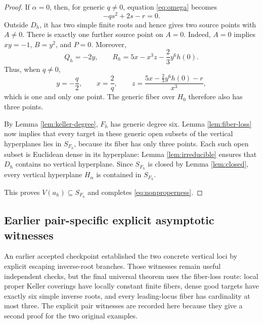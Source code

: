 \documentclass[11pt]{article}
\begin{document}
\begin{proof}
If $\alpha=0$, then, for generic $q\ne0$, equation \eqref{eq:omega} becomes
\[
 -qs^2+2s-r=0.
\]
Outside $D_h$, it has two simple finite roots and hence gives two source
points with $A\ne0$.  There is exactly one further source point on $A=0$.
Indeed, $A=0$ implies $xy=-1$, $B=y^2$, and $P=0$.  Moreover,
\[
 Q_h=-2y,
 \qquad
 R_h=5x-x^3z-\frac23y^6h(0).
\]
Thus, when $q\ne0$,
\[
 y=-\frac q2,
 \qquad
 x=\frac2q,
 \qquad
 z=\frac{5x-\frac23y^6h(0)-r}{x^3},
\]
which is one and only one point.  The generic fiber over $H_0$ therefore also
has three points.

By Lemma \ref{lem:keller-degree}, $F_h$ has generic degree six.  Lemma
\ref{lem:fiber-loss} now implies that every target in these generic open
subsets of the vertical hyperplanes lies in $S_{F_h}$, because its fiber has
only three points.  Each such open subset is Euclidean dense in its
hyperplane: Lemma \ref{lem:irreducible} ensures that $D_h$ contains no
vertical hyperplane.  Since $S_{F_h}$ is closed by Lemma \ref{lem:closed},
every vertical hyperplane $H_\alpha$ is contained in $S_{F_h}$.

This proves $V(a_h)\subseteq S_{F_h}$ and completes
\eqref{eq:nonproperness}.
\end{proof}


\subsection{Earlier pair-specific explicit asymptotic witnesses}
\label{subsec:explicit-witnesses}

An earlier accepted checkpoint established the two concrete vertical loci by
explicit escaping inverse-root branches.  Those witnesses remain useful
independent checks, but the final universal theorem uses the fiber-loss route:
local proper Keller coverings have locally constant finite fibers, dense good
targets have exactly six simple inverse roots, and every leading-locus fiber
has cardinality at most three.  The explicit pair witnesses are recorded here
because they give a second proof for the two original examples.
\end{document}
